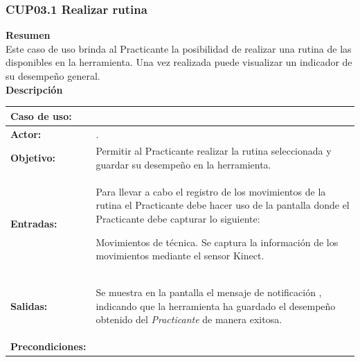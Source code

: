 \subsubsection{CUP03.1 Realizar rutina}
\label{cu:CUP03.1}

\textbf{\textcolor[rgb]{0, 0, 0.545098}{Resumen}} \\

Este caso de uso brinda al Practicante la posibilidad de realizar una rutina de las disponibles en la herramienta. Una vez realizada puede visualizar un indicador de su desempeño general. \\

\textbf{\textcolor[rgb]{0, 0, 0.545098}{Descripción}}

\begin{table}[H]
\centering
\begin{tabular}{| l | p{12 cm} |}
\hline
\rowcolor[rgb]{0.529412, 0.807843, 0.980392} {\textbf{Caso de uso:}} & \hspace{7em}{\textbf{CUP03.1 Realizar rutina}}\\
\hline
\textbf{Actor:} &  \nameref{act:Practicante}. \\
\hline
\textbf{Objetivo:} & Permitir al Practicante realizar la rutina seleccionada y guardar su desempeño en la herramienta.\\
\hline
\textbf{Entradas:} & Para llevar a cabo el registro de los movimientos de la rutina el Practicante debe hacer uso de la pantalla \nameref{pant:IUP03.1} donde el Practicante debe capturar lo siguiente:
		\begin{compactitem} 
			\setlength\itemsep{-0.25em}
			\item Movimientos de técnica. Se captura la información de los movimientos mediante el sensor Kinect.
		\end{compactitem} \\
\hline
\textbf{Salidas:} & \vspace{-2mm}	%
					\begin{compactitem}
						\setlength\itemsep{-0.25em}
						\item Se muestra en la pantalla \nameref{pant:IUP03.1} el mensaje de notificación \nameref{msj:MSG01}, indicando que la herramienta ha guardado el desempeño obtenido del \textit{Practicante} de manera exitosa.
					\end{compactitem}\\
\hline
\textbf{Precondiciones:} & 	\vspace{-2mm}	%

\end{tabular}
\end{table}

